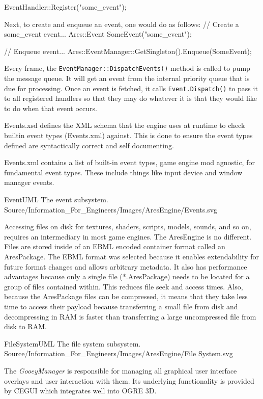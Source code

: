 \StartCodeExample
EventHandler::Register("some_event");
\StopCodeExample

Next, to create and enqueue an event, one would do as follows:
\StartCodeExample
\starttyping
// Create a some_event event...
Ares::Event SomeEvent("some_event");

// Enqueue event...
Ares::EventManager::GetSingleton().Enqueue(SomeEvent);
\stoptyping
\StopCodeExample

Every frame, the {\tt EventManager::DispatchEvents()} method is called to pump the message queue. It will get an event from the internal priority queue that is due for processing. Once an event is fetched, it calls {\tt Event.Dispatch()} to pass it to all registered handlers so that they may do whatever it is that they would like to do when that event occurs.

Events.xsd defines the XML schema that the engine uses at runtime to check builtin event types (Events.xml) against. This is done to ensure the event types defined are syntactically correct and self documenting.

Events.xml contains a list of built-in event types, game engine mod agnostic, for fundamental event types. These include things like input device and window manager events.

\FullPageLandscapeDiagram
    {EventUML}
    {The event subsystem.}
    {Source/Information_For_Engineers/Images/AresEngine/Events.svg}

\page 
{}
Accessing files on disk for textures, shaders, scripts, models, sounds, and so on, requires an intermediary in most game engines. The AresEngine is no different. Files are stored inside of an EBML encoded container format called an AresPackage. The EBML format was selected because it enables extendability for future format changes and allows arbitrary metadata. It also has performance advantages because only a single file (*.AresPackage) needs to be located for a group of files contained within. This reduces file seek and access times. Also, because the AresPackage files can be compressed, it means that they take less time to access their payload because transferring a small file from disk and decompressing in RAM is faster than transferring a large uncompressed file from disk to RAM.

\FullPageLandscapeDiagram
    {FileSystemUML}
    {The file system subsystem.}
    {Source/Information_For_Engineers/Images/AresEngine/File System.svg}

\page 
{}
The {\it GooeyManager} is responsible for managing all graphical user interface overlays and user interaction with them. Its underlying functionality is provided by CEGUI which integrates well into OGRE 3D.

